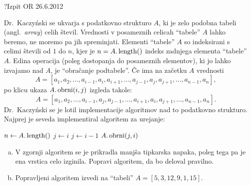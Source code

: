 \begin{naloga}{?}{Izpit OR 26.6.2012}
\begin{vprasanje}
Dr.~Kaczyński se ukvarja s podatkovno strukturo $A$,
ki je zelo podobna tabeli (angl.~{\em array}) celih števil.
Vrednosti v posameznih celicah ``tabele'' $A$ lahko beremo,
ne moremo pa jih spreminjati.
Elementi ``tabele'' $A$ so indeksirani s celimi števili od $1$ do $n$,
kjer je $n = A.\operatorname{length}()$ indeks zadnjega elementa ``tabele'' $A$.
Edina operacija (poleg dostopanja do posameznih elementov),
ki jo lahko izvajamo nad $A$, je ``obračanje podtabele''.
Če ima na začetku $A$ vrednosti
$$
A = [a_1, a_2, \dots, a_{i-1}, a_i, a_{i+1}, \dots, a_{j-1}, a_j, a_{j+1},
     \dots, a_{n-1}, a_n],
$$
po klicu ukaza $A.\operatorname{obrni}(i, j)$ izgleda takole:
$$
A = [a_1, a_2, \dots, a_{i-1}, a_j, a_{j-1}, \dots, a_{i+1}, a_i, a_{j+1},
     \dots, a_{n-1}, a_n] .
$$
Dr.~Kaczyński se je lotil implementacije algoritmov
nad to podatkovno strukturo.
Najprej je seveda implementiral algoritem za urejanje:
\begin{small}
\begin{algorithmic}
\State $n \gets A.\operatorname{length}()$
    \State $j \gets i$
        \State $j \gets i-1$
    \EndWhile
    \State $A.\operatorname{obrni}(j, i)$
        \State
    \EndIf
\EndFor
\end{algorithmic}
\end{small}

\begin{enumerate}[(a)]
\item V zgornji algoritem se je prikradla manjša tipkarska napaka,
poleg tega pa je ena vrstica celo izginila.
Popravi algoritem, da bo deloval pravilno.

\item Popravljeni algoritem izvedi na ``tabeli'' $A = [5, 3, 12, 9, 1, 15]$.
\end{enumerate}
\end{vprasanje}
\begin{odgovor}
\end{odgovor}
\end{naloga}



